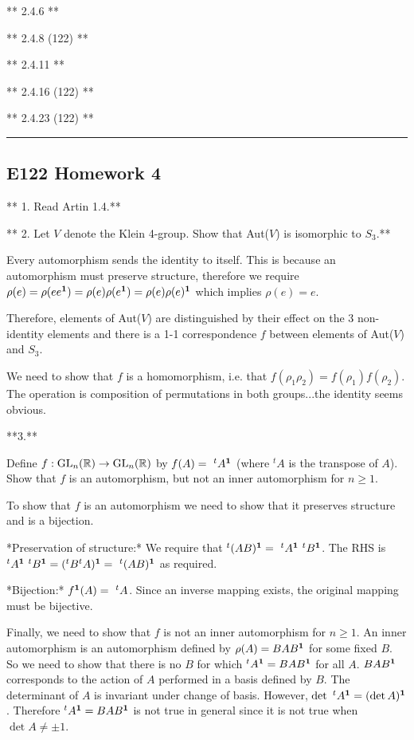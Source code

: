** 2.4.6 **

** 2.4.8 (122) **

** 2.4.11 **

** 2.4.16 (122) **

** 2.4.23 (122) **


\hrule
\subsection{E122 Homework 4}
** 1. Read Artin 1.4.**

** 2. Let $V$ denote the Klein 4-group. Show that Aut($V$) is isomorphic to $S_3$.**

Every automorphism sends the identity to itself. This is because an
automorphism must preserve structure, therefore we require $\rho(e) =
\rho(ee^{\mathbf 1}) = \rho(e)\rho(e^{\mathbf 1}) = \rho(e)\rho(e)^{\mathbf 1}$ which implies $\rho(e) =
e$.

Therefore, elements of Aut($V$) are distinguished by their effect on the 3
non-identity elements and there is a 1-1 correspondence $f$ between elements of
Aut($V$) and $S_3$.

We need to show that $f$ is a homomorphism, i.e. that $f(\rho_1 \rho_2) =
f(\rho_1) f(\rho_2)$. The operation is composition of permutations in both
groups...the identity seems obvious.

**3.**

Define $f : \mathrm{GL}_n(\mathbb{R}) \rightarrow \mathrm{GL}_n(\mathbb{R})$ by $f(A) =~ ^tA^{\mathbf 1}$ (where $^tA$
is the transpose of $A$). Show that $f$ is an automorphism, but not an inner
automorphism for $n ≥ 1$.

To show that $f$ is an automorphism we need to show that it preserves structure
and is a bijection.

*Preservation of structure:* We require that $^t(AB)^{\mathbf 1} =~ ^tA^{\mathbf 1}~ ^tB^{\mathbf 1}$.
The RHS is $^tA^{\mathbf 1}~ ^tB^{\mathbf 1} = (^tB^tA)^{\mathbf 1} = ~^t(AB)^{\mathbf 1}$ as required.

*Bijection:* $f^{\mathbf 1}(A) =~ ^tA$. Since an inverse mapping exists, the original
mapping must be bijective.

Finally, we need to show that $f$ is not an inner automorphism for $n \geq
1$. An inner automorphism is an automorphism defined by $\rho(A) = BAB^{\mathbf 1}$ for
some fixed $B$. So we need to show that there is no $B$ for which $^tA^{\mathbf 1} =
BAB^{\mathbf 1}$ for all $A$. $BAB^{\mathbf 1}$ corresponds to the action of $A$ performed in a
basis defined by $B$. The determinant of $A$ is invariant under change of
basis. However, $\det ~^tA^{\mathbf 1} = (\det A)^{\mathbf 1}$. Therefore $^tA^{\mathbf 1} = BAB^{\mathbf 1}$ is
not true in general since it is not true when $\det A \neq \pm 1$.

